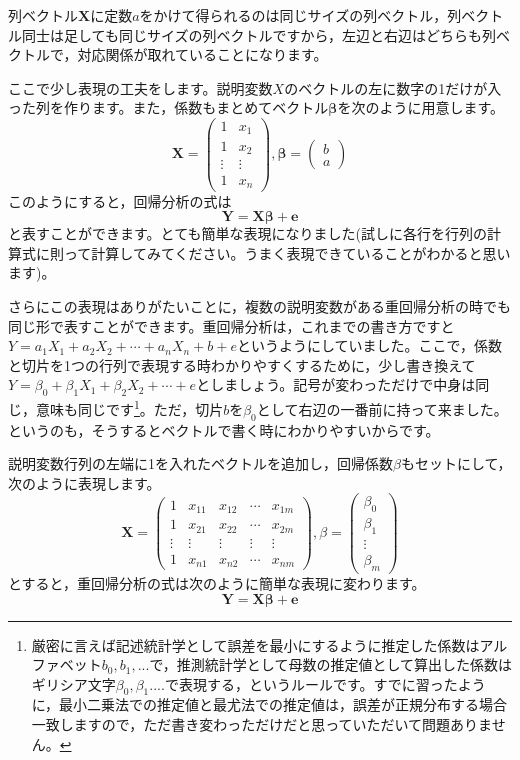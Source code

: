 \documentclass{ltjsbook}
\begin{document}
列ベクトル$\bm{X}$に定数$a$をかけて得られるのは同じサイズの列ベクトル，列ベクトル同士は足しても同じサイズの列ベクトルですから，左辺と右辺はどちらも列ベクトルで，対応関係が取れていることになります。

ここで少し表現の工夫をします。説明変数$X$のベクトルの左に数字の1だけが入った列を作ります。また，係数もまとめてベクトル$\bm{\beta}$を次のように用意します。
\[
\bm{X} = 
\begin{pmatrix}
1 & x_1\\
1 & x_2\\
\vdots & \vdots \\
1 & x_n
\end{pmatrix},
\bm{\beta}=
\begin{pmatrix}
b\\
a
\end{pmatrix}
\]
このようにすると，回帰分析の式は
\[ \bm{Y} = \bm{X\beta} + \bm{e} \]
と表すことができます。とても簡単な表現になりました(試しに各行を行列の計算式に則って計算してみてください。うまく表現できていることがわかると思います)。

さらにこの表現はありがたいことに，複数の説明変数がある重回帰分析の時でも同じ形で表すことができます。重回帰分析は，これまでの書き方ですと$Y = a_1 X_1 + a_2 X_2 + \cdots + a_n X_n + b + e$というようにしていました。ここで，係数と切片を1つの行列で表現する時わかりやすくするために，少し書き換えて$Y = \beta_0 + \beta_1 X_1 + \beta_2 X_2 +\cdots +e $としましょう。記号が変わっただけで中身は同じ，意味も同じです\footnote{厳密に言えば記述統計学として誤差を最小にするように推定した係数はアルファベット$b_0,b_1,...$で，推測統計学として母数の推定値として算出した係数はギリシア文字$\beta_0,\beta_1....$で表現する，というルールです。すでに習ったように，最小二乗法での推定値と最尤法での推定値は，誤差が正規分布する場合一致しますので，ただ書き変わっただけだと思っていただいて問題ありません。}。ただ，切片$b$を$\beta_0$として右辺の一番前に持って来ました。というのも，そうするとベクトルで書く時にわかりやすいからです。

説明変数行列の左端に1を入れたベクトルを追加し，回帰係数$\beta$もセットにして，次のように表現します。
\[
\bm{X} = \begin{pmatrix}
1 & x_{11} & x_{12} & \cdots & x_{1m}\\
1 & x_{21} & x_{22} & \cdots & x_{2m}\\
\vdots & \vdots & \vdots & \vdots & \vdots\\
1 & x_{n1} & x_{n2} & \cdots & x_{nm}
\end{pmatrix},
\beta=\begin{pmatrix}
\beta_0\\
\beta_1\\
\vdots\\
\beta_m
\end{pmatrix}
\]
とすると，重回帰分析の式は次のように簡単な表現に変わります。
\[ \bm{Y} = \bm{X \beta} + \bm{e} \]
\end{document}

